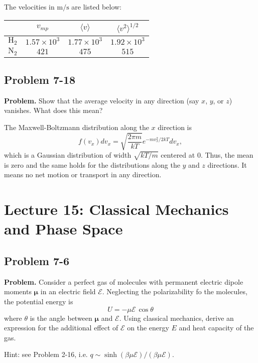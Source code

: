\documentclass[twocolumn, 10pt]{article}
\numberwithin{equation}{section}
\newenvironment{problem}
{\par\medskip \color{problemblue}
  \textbf{Problem. }\ignorespaces}
{\medskip}
\newenvironment{solution}[1][\empty]
{\par\medskip\sffamily
  \textbf{\ifx\empty#1{Solution.}\relax\else{#1}\fi} \ignorespaces}
{\medskip}
\begin{document}
\begin{solution}
The velocities in $\mathrm{m/s}$ are listed below:
\begin{table}[h]\centering
  \def\arraystretch{1.2}\tabcolsep=7pt
\begin{tabular}{c | c c c}
  \hline \hline
  & $v_{mp}$  & $\langle v \rangle$ & $\langle v^2 \rangle^{1/2}$\\
  \hline
  $\mathrm H_2$ &
  $1.57\times10^3$ &
  $1.77\times10^3$ &
  $1.92\times10^3$\\
  \hline
  $\mathrm N_2$ &
  $421$ &
  $475$ &
  $515$ \\
  \hline \hline
\end{tabular}
\end{table}
\end{solution}

\subsection{Problem 7-18}

\begin{problem}
  Show that the average velocity in any direction
  (say $x$, $y$, or $z$) vanishes.
  What does this mean?
\end{problem}

\begin{solution}
  The Maxwell-Boltzmann distribution along the $x$ direction is
  $$
  f(v_x) d v_x = \sqrt{\frac{2\pi m }{kT}} e^{-m v_x^2/2kT} d v_x,
  $$
  which is a Gaussian distribution of width $\sqrt{kT/m}$
  centered at $0$.
  Thus, the mean is zero
  and the same holds for the distributions
  along the $y$ and $z$ directions.
  It means no net motion or transport in any direction.
\end{solution}

\section{Lecture 15: Classical Mechanics and Phase Space}

\subsection{Problem 7-6}

\begin{problem}
  Consider a perfect gas of molecules
  with permanent electric dipole moments $\pmb\mu$
  in an electric field $\mathscr E$.
  Neglecting the polarizability fo the molecules,
  the potential energy is
  \begin{equation}
    U = -\mu \mathscr E \, \cos\theta
    \label{eq:U_muE}
  \end{equation}
  where $\theta$ is the angle between $\pmb\mu$
  and $\mathscr E$.
  Using classical mechanics,
  derive an expression for the additional effect of $\mathscr E$
  on the energy $E$ and heat capacity of the gas.

  Hint: see Problem 2-16, i.e.
  $q \sim \sinh(\beta \mu \mathscr E)/(\beta \mu \mathscr E)$.
\end{problem}
\end{document}
